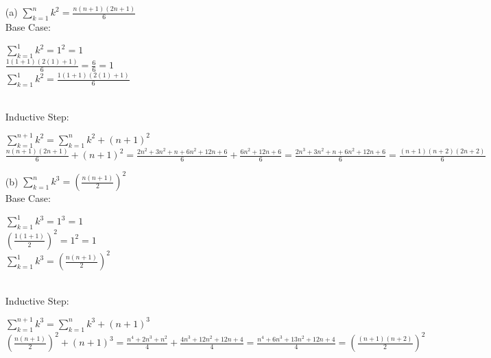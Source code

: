 \documentclass[12pt]{article}
\begin{document}
\begin{enumerate}
\item[(a)] $\sum_{k=1}^{n} k^2 = \frac{n(n+1)(2n+1)}{6}$
\\[8pt]
Base Case:
\\[8pt]
\begin{minipage}[t][3cm][t]{\linewidth}
    $\displaystyle \sum_{k=1}^{1} k^2 = 1^2 = 1$
    \\[8pt] $\frac{1(1+1)(2(1)+1)}{6} = \frac{6}{6} = 1$
    \\[8pt] $\sum_{k=1}^{1} k^2 = \frac{1(1+1)(2(1)+1)}{6}$
\end{minipage}
\\[8pt]
Inductive Step:
\\[8pt]
\begin{minipage}[t][3cm][t]{\linewidth}
    $\displaystyle \sum_{k=1}^{n+1} k^2 = \sum_{k=1}^{n} k^2 + (n+1)^2$
    \\[8pt] $\frac{n(n+1)(2n+1)}{6} + (n+1)^2 = \frac{2n^2+3n^2+n+6n^2+12n+6}{6} + \frac{6n^2+12n+6}{6} = \frac{2n^3+3n^2+n+6n^2+12n+6}{6} = \frac{(n+1)(n+2)(2n+2)}{6}$
\end{minipage}

\item[(b)] $\sum_{k=1}^{n} k^3 = \left(\frac{n(n+1)}{2}\right)^2$
\\[8pt]
Base Case:
\\[8pt]
\begin{minipage}[t][3cm][t]{\linewidth}
    $\displaystyle \sum_{k=1}^{1} k^3 = 1^3 = 1$
    \\[8pt] $(\frac{1(1+1)}{2})^2 = 1^2 = 1$
    \\[8pt] $\sum_{k=1}^{1} k^3 = (\frac{n(n+1)}{2})^2$
\end{minipage}
\\[8pt]
Inductive Step:
\\[8pt]
\begin{minipage}[t][3cm][t]{\linewidth}
    $\displaystyle \sum_{k=1}^{n+1} k^3 = \sum_{k=1}^{n} k^3 + (n+1)^3$
    \\[8pt] $(\frac{n(n+1)}{2})^2 + (n+1)^3 = \frac{n^4+2n^3+n^2}{4} + \frac{4n^3+12n^2+12n+4}{4} = \frac{n^4+6n^3+13n^2+12n+4}{4} = (\frac{(n+1)(n+2)}{2})^2$
\end{minipage}

\newpage


\end{enumerate}
\end{document}
